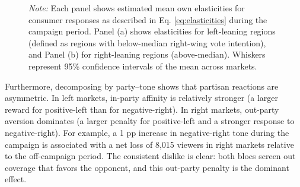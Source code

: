 \documentclass[12pt]{article}
\begin{document}
\begin{figure}[!htbp]
	\vspace{0.5em} %
	
	\captionsetup{justification=justified}
	\caption*{\small  \textit{Note:}  Each panel shows estimated mean own elasticities for consumer responses  as described in Eq. \eqref{eq:elasticities} during the campaign period. Panel (a) shows elasticities for left-leaning regions (defined as regions with below-median right-wing vote intention), and Panel (b) for right-leaning regions (above-median). Whiskers represent 95\% confidence intervals of the mean across markets.}
	
\end{figure}

Furthermore, decomposing by party–tone shows that partisan reactions are asymmetric. In left markets, in-party affinity is relatively stronger (a larger reward for positive-left than for negative-right). In right markets, out-party aversion dominates (a larger penalty for positive-left and a stronger response to negative-right). For example, a 1 pp increase in negative-right tone during the campaign is associated with a net loss of 8,015 viewers in right markets relative to the off-campaign period. The consistent dislike is clear: both blocs screen out coverage that favors the opponent, and this out-party penalty is the dominant effect. 










\end{document}
